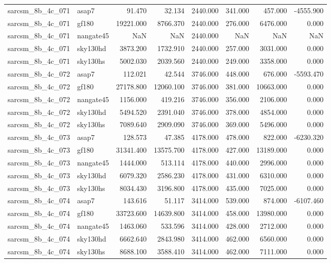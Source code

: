 \begin{tabular}{llrrrrrr}
sarcsm\_8b\_4c\_071 & asap7 & 91.470 & 32.134 & 2440.000 & 341.000 & 457.000 & -4555.900 \\
sarcsm\_8b\_4c\_071 & gf180 & 19221.000 & 8766.370 & 2440.000 & 276.000 & 6476.000 & 0.000 \\
sarcsm\_8b\_4c\_071 & nangate45 & NaN & NaN & 2440.000 & NaN & NaN & NaN \\
sarcsm\_8b\_4c\_071 & sky130hd & 3873.200 & 1732.910 & 2440.000 & 257.000 & 3031.000 & 0.000 \\
sarcsm\_8b\_4c\_071 & sky130hs & 5002.030 & 2039.560 & 2440.000 & 249.000 & 3358.000 & 0.000 \\
sarcsm\_8b\_4c\_072 & asap7 & 112.021 & 42.544 & 3746.000 & 448.000 & 676.000 & -5593.470 \\
sarcsm\_8b\_4c\_072 & gf180 & 27178.800 & 12060.100 & 3746.000 & 381.000 & 10663.000 & 0.000 \\
sarcsm\_8b\_4c\_072 & nangate45 & 1156.000 & 419.216 & 3746.000 & 356.000 & 2106.000 & 0.000 \\
sarcsm\_8b\_4c\_072 & sky130hd & 5494.520 & 2391.040 & 3746.000 & 378.000 & 4854.000 & 0.000 \\
sarcsm\_8b\_4c\_072 & sky130hs & 7089.640 & 2909.090 & 3746.000 & 369.000 & 5496.000 & 0.000 \\
sarcsm\_8b\_4c\_073 & asap7 & 128.573 & 47.385 & 4178.000 & 478.000 & 822.000 & -6230.320 \\
sarcsm\_8b\_4c\_073 & gf180 & 31341.400 & 13575.700 & 4178.000 & 427.000 & 13189.000 & 0.000 \\
sarcsm\_8b\_4c\_073 & nangate45 & 1444.000 & 513.114 & 4178.000 & 440.000 & 2996.000 & 0.000 \\
sarcsm\_8b\_4c\_073 & sky130hd & 6079.320 & 2586.230 & 4178.000 & 431.000 & 6310.000 & 0.000 \\
sarcsm\_8b\_4c\_073 & sky130hs & 8034.430 & 3196.800 & 4178.000 & 435.000 & 7025.000 & 0.000 \\
sarcsm\_8b\_4c\_074 & asap7 & 143.616 & 51.117 & 3414.000 & 539.000 & 874.000 & -6107.460 \\
sarcsm\_8b\_4c\_074 & gf180 & 33723.600 & 14639.800 & 3414.000 & 458.000 & 13980.000 & 0.000 \\
sarcsm\_8b\_4c\_074 & nangate45 & 1463.060 & 533.596 & 3414.000 & 428.000 & 2712.000 & 0.000 \\
sarcsm\_8b\_4c\_074 & sky130hd & 6662.640 & 2843.980 & 3414.000 & 462.000 & 6560.000 & 0.000 \\
sarcsm\_8b\_4c\_074 & sky130hs & 8688.100 & 3588.410 & 3414.000 & 462.000 & 7111.000 & 0.000 \\

\end{tabular}
